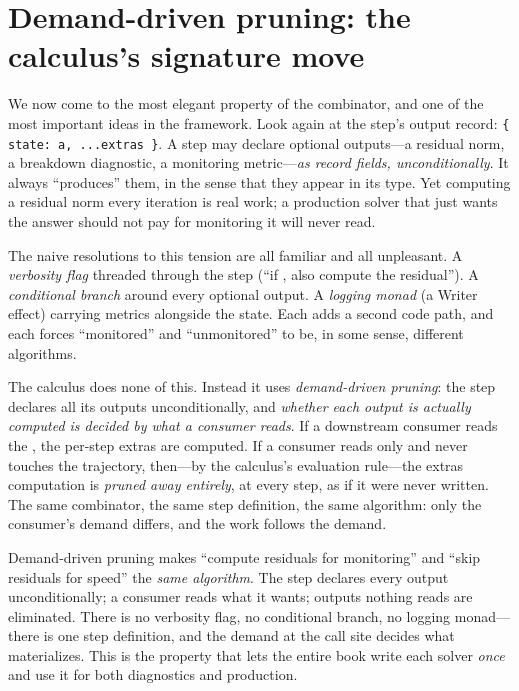 \section{Demand-driven pruning: the calculus's signature move}
\label{sec:pruning}

We now come to the most elegant property of the combinator, and one of the most
important ideas in the framework. Look again at the step's output record:
\lstinline[style=l4style]|{ state: a, ...extras }|. A step may declare optional
outputs---a residual norm, a breakdown diagnostic, a monitoring metric---\emph{as
record fields, unconditionally}. It always ``produces'' them, in the sense that
they appear in its type. Yet computing a residual norm every iteration is real
work; a production solver that just wants the answer should not pay for
monitoring it will never read.

The naive resolutions to this tension are all familiar and all unpleasant. A
\emph{verbosity flag} threaded through the step (``if , also compute
the residual''). A \emph{conditional branch} around every optional output. A
\emph{logging monad} (a Writer effect) carrying metrics alongside the state. Each
adds a second code path, and each forces ``monitored'' and ``unmonitored'' to be,
in some sense, different algorithms.

The calculus does none of this. Instead it uses \emph{demand-driven pruning}: the
step declares all its outputs unconditionally, and \emph{whether each output is
actually computed is decided by what a consumer reads}. If a downstream consumer
reads the , the per-step extras are computed. If a consumer reads
only  and never touches the trajectory, then---by the calculus's
evaluation rule---the extras computation is \emph{pruned away entirely}, at every
step, as if it were never written. The same combinator, the same step
definition, the same algorithm: only the consumer's demand differs, and the work
follows the demand.

\begin{keyidea}
Demand-driven pruning makes ``compute residuals for monitoring'' and ``skip
residuals for speed'' the \emph{same algorithm}. The step declares every output
unconditionally; a consumer reads what it wants; outputs nothing reads are
eliminated. There is no verbosity flag, no conditional branch, no logging
monad---there is one step definition, and the demand at the call site decides
what materializes. This is the property that lets the entire book write each
solver \emph{once} and use it for both diagnostics and production.
\end{keyidea}

